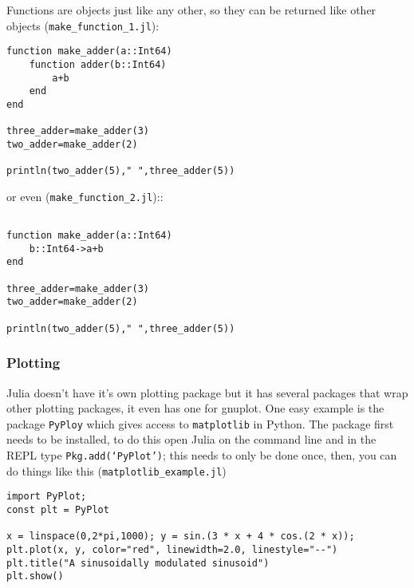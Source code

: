 \documentclass[11pt,a4paper]{scrartcl}
\begin{document}
Functions are objects just like any other, so they can be returned
like other objects (\texttt{make\_function\_1.jl}):
\begin{lstlisting}[numbers=right]
function make_adder(a::Int64)
    function adder(b::Int64)
        a+b
    end
end

three_adder=make_adder(3)
two_adder=make_adder(2)

println(two_adder(5)," ",three_adder(5))
\end{lstlisting}
or even (\texttt{make\_function\_2.jl})::
\begin{lstlisting}[numbers=right]

function make_adder(a::Int64)
    b::Int64->a+b
end

three_adder=make_adder(3)
two_adder=make_adder(2)

println(two_adder(5)," ",three_adder(5))
\end{lstlisting}

\subsubsection*{Plotting}

Julia doesn't have it's own plotting package but it has several
packages that wrap other plotting packages, it even has one for
gnuplot. One easy example is the package \texttt{PyPloy} which gives
access to \texttt{matplotlib} in Python. The package first needs to be
installed, to do this open Julia on the command line and in the REPL
type \texttt{Pkg.add(\lq{}PyPlot\rq{})}; this needs to only be done
once, then, you can do things like this (\texttt{matplotlib\_example.jl})
\begin{lstlisting}[numbers=right]
import PyPlot; 
const plt = PyPlot

x = linspace(0,2*pi,1000); y = sin.(3 * x + 4 * cos.(2 * x));
plt.plot(x, y, color="red", linewidth=2.0, linestyle="--")
plt.title("A sinusoidally modulated sinusoid")
plt.show()
\end{lstlisting}
\end{document}
